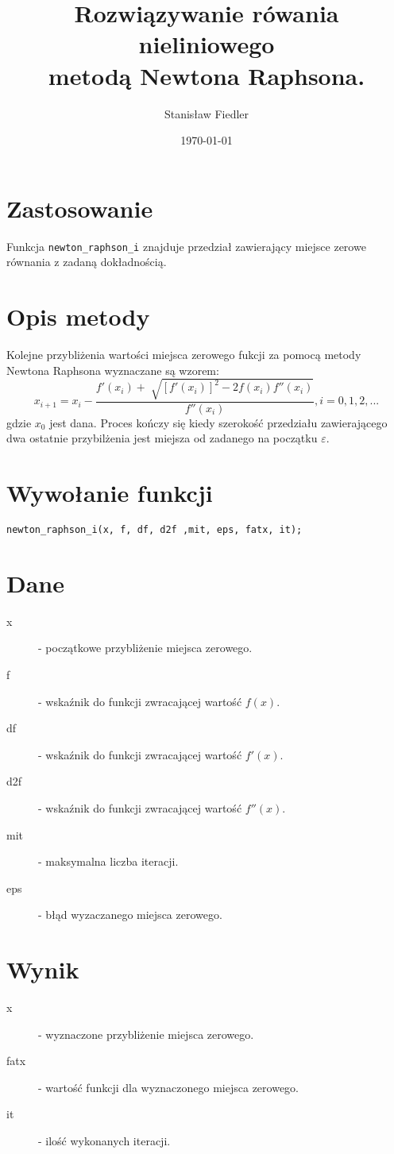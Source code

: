 \documentclass[11pt]{article}
\title{%
    Rozwiązywanie rówania nieliniowego \\
    metodą Newtona Raphsona.}
\author{ Stanisław Fiedler }
\date{\today}
\begin{document}
\maketitle	

\section{Zastosowanie}
    Funkcja \verb|newton_raphson_i| znajduje przedział zawierający miejsce zerowe równania z zadaną dokładnością.
\section{Opis metody}
    Kolejne przybliżenia wartości miejsca zerowego fukcji za pomocą metody Newtona Raphsona wyznaczane są wzorem:
    $$x_{i+1} = x_i - \frac{f'(x_i)+\sqrt[]{[f'(x_i)]^2-2f(x_i)f''(x_i)}}{f''(x_i)}, i = 0, 1, 2, ...$$
    gdzie $x_0$ jest dana. 
    Proces kończy się kiedy szerokość przedziału zawierającego dwa ostatnie przybilżenia jest miejsza od zadanego na początku $\varepsilon$.
\section{Wywołanie funkcji}
    \verb|newton_raphson_i(x, f, df, d2f ,mit, eps, fatx, it);|
\section{Dane}
    \begin{description}
        \item[x] - początkowe przybliżenie miejsca zerowego.
        \item[f] - wskaźnik do funkcji zwracającej wartość $f(x)$.
        \item[df] - wskaźnik do funkcji zwracającej wartość $f'(x)$.
        \item[d2f] - wskaźnik do funkcji zwracającej wartość $f''(x)$.
        \item[mit] - maksymalna liczba iteracji.
        \item[eps] - błąd wyzaczanego miejsca zerowego.
    \end{description}
\section{Wynik}
    \begin{description}
        \item[x] - wyznaczone przybliżenie miejsca zerowego.
        \item[fatx] - wartość funkcji dla wyznaczonego miejsca zerowego.
        \item[it] - ilość wykonanych iteracji.
    \end{description}
\end{document}

